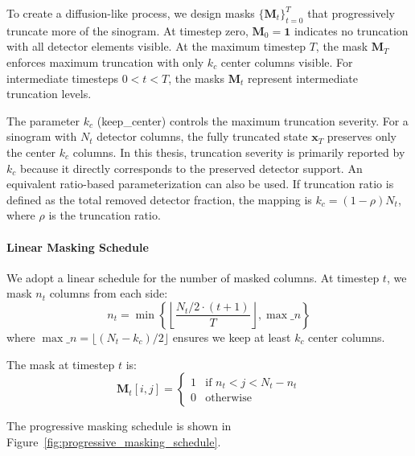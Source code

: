 To create a diffusion-like process, we design masks $\{\mathbf{M}_t\}_{t=0}^T$ that progressively truncate more of the sinogram. At timestep zero, $\mathbf{M}_0 = \mathbf{1}$ indicates no truncation with all detector elements visible. At the maximum timestep $T$, the mask $\mathbf{M}_T$ enforces maximum truncation with only $k_c$ center columns visible. For intermediate timesteps $0 < t < T$, the masks $\mathbf{M}_t$ represent intermediate truncation levels.

The parameter $k_c$ (keep\_center) controls the maximum truncation severity. For a sinogram with $N_t$ detector columns, the fully truncated state $\mathbf{x}_T$ preserves only the center $k_c$ columns.
In this thesis, truncation severity is primarily reported by $k_c$ because it directly corresponds to the preserved detector support. An equivalent ratio-based parameterization can also be used. If truncation ratio is defined as the total removed detector fraction, the mapping is \(k_c = (1-\rho)N_t\), where \(\rho\) is the truncation ratio.

\paragraph{Linear Masking Schedule} We adopt a linear schedule for the number of masked columns. At timestep $t$, we mask $n_t$ columns from each side:
%
\begin{equation}
n_t = \min\left\{ \left\lfloor \frac{N_t/2 \cdot (t+1)}{T} \right\rfloor, \max\_n \right\}
\label{eq:mask_schedule}
\end{equation}
%
where $\max\_n = \lfloor (N_t - k_c) / 2 \rfloor$ ensures we keep at least $k_c$ center columns.

The mask at timestep $t$ is:
%
\begin{equation}
\mathbf{M}_t[i,j] = \begin{cases}
1 & \text{if } n_t < j < N_t - n_t \\
0 & \text{otherwise}
\end{cases}
\end{equation}

The progressive masking schedule is shown in Figure~\ref{fig:progressive_masking_schedule}.

